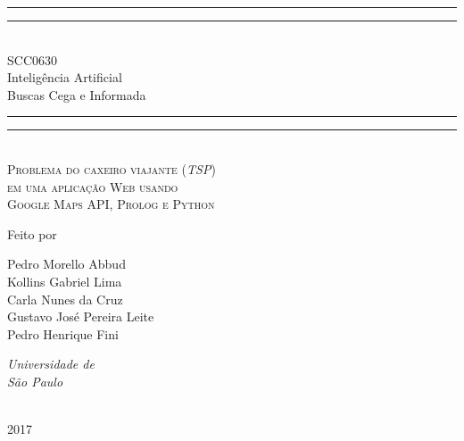 \documentclass[12pt,a4paper]{article}
\begin{document}
\newcommand*{\plogo}{\fbox{$\mathcal{ICMC}$}} %


\newcommand*{\titleGP}{\begingroup %
\centering %
\vspace*{\baselineskip} %

\rule{\textwidth}{1.6pt}\vspace*{-\baselineskip}\vspace*{2pt} %
\rule{\textwidth}{0.4pt}\\[\baselineskip] %

{\LARGE SCC0630\\ Inteligência Artificial\\[0.5\baselineskip] Buscas Cega e Informada}\\[0.2\baselineskip] %

\rule{\textwidth}{0.4pt}\vspace*{-\baselineskip}\vspace{3.2pt} %
\rule{\textwidth}{1.6pt}\\[\baselineskip] %

\scshape %
Problema do caxeiro viajante (\emph{TSP})\\ %
em uma aplicação Web usando \\ %
Google Maps API, Prolog e Python\par %

\vspace*{2\baselineskip} %

Feito por\\[\baselineskip]
{\Large Pedro Morello Abbud\\ 
Kollins Gabriel Lima 	\\	
Carla Nunes da Cruz 	\\
Gustavo José Pereira Leite \\	
Pedro Henrique Fini 		\par} %

\vfill %
{\itshape Universidade de\\ São Paulo\par} %

\vfill %

\plogo \\[0.3\baselineskip] %
{\scshape 2017} \\[0.3\baselineskip] %

\endgroup}
\titleGP
\newpage
\end{document}
